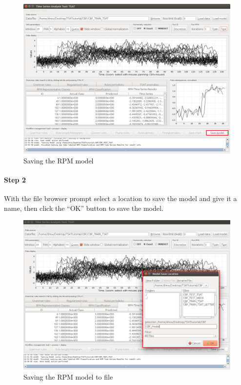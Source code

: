 \documentclass[letterpaper, 12pt]{article}
\begin{document}
\begin{figure}[H]
	\includegraphics[width=\textwidth]{TSAT-save-model-step-1}
	\caption{Saving the RPM model}
	\label{fig:TSAT-save-model-step-1}
\end{figure}

\newpage
\paragraph{Step 2}
With the file browser prompt select a location to save the model and give it a name, then click the ``OK'' button to save the model.

\begin{figure}[H]
	\includegraphics[width=\textwidth]{TSAT-save-model-step-2}
	\caption{Saving the RPM model to file}
	\label{fig:TSAT-save-model-step-2}
\end{figure}
\end{document}
